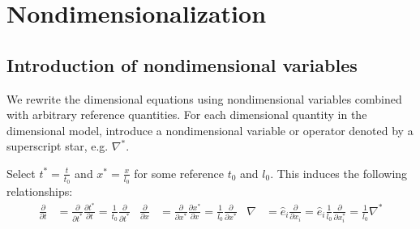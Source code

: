 \documentclass[letterpaper,11pt,nointlimits,reqno,draft]{amsbook}
\begin{document}
\section{Nondimensionalization}
\label{sec:nondim}

\subsection{Introduction of nondimensional variables}
\label{sec:intronondim}

We rewrite the dimensional equations using nondimensional variables
combined with arbitrary reference quantities.  For each dimensional
quantity in the dimensional model, introduce a nondimensional variable
or operator denoted by a superscript star, e.g. $\nabla^{*}$.

Select $t^{*}=\frac{t}{t_{0}}$ and $x^{*}=\frac{x}{l_{0}}$ for some reference
$t_{0}$ and $l_{0}$.  This induces the following relationships:
\begin{align}
  \frac{\partial{}}{\partial{}t}
  &=
  \frac{\partial{}}{\partial{}t^{*}}
  \frac{\partial{}t^{*}}{\partial{}t}
  =
  \frac{1}{t_{0}}\frac{\partial}{\partial{}t^{*}}
  &
  \frac{\partial{}}{\partial{}x}
  &=
  \frac{\partial{}}{\partial{}x^{*}}
  \frac{\partial{}x^{*}}{\partial{}x}
  =
  \frac{1}{l_{0}}\frac{\partial}{\partial{}x^{*}}
  &
  \nabla
  &=
  \hat{e}_{i} \frac{\partial{}}{\partial{}x_{i}}
  =
  \hat{e}_{i} \frac{1}{l_{0}} \frac{\partial}{\partial{}x^{*}_{i}}
  =
  \frac{1}{l_{0}} \nabla^{*}
  \label{eq:nondim_derivops}
\end{align}
\end{document}
